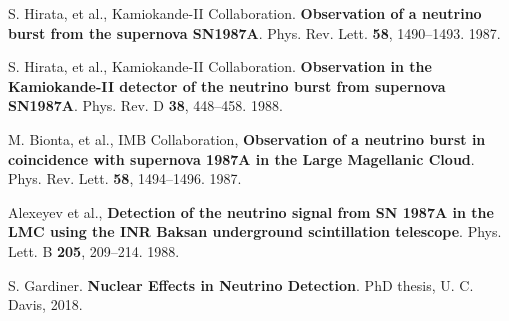  S. Hirata, et al., Kamiokande-II Collaboration. \textbf{Observation of a neutrino burst from the supernova SN1987A}. Phys. Rev. Lett. \textbf{58}, 1490–1493. 1987.

 S. Hirata, et al., Kamiokande-II Collaboration. \textbf{Observation in the Kamiokande-II detector of the neutrino burst from supernova SN1987A}. Phys. Rev. D \textbf{38}, 448–458. 1988.

 M. Bionta, et al., IMB Collaboration, \textbf{Observation of a neutrino burst in coincidence with supernova 1987A in the Large Magellanic Cloud}. Phys. Rev. Lett. \textbf{58}, 1494–1496. 1987. 

 Alexeyev et al., \textbf{Detection of the neutrino signal from SN 1987A in the LMC using the INR Baksan underground scintillation telescope}. Phys. Lett. B \textbf{205}, 209–214. 1988.

 S. Gardiner. \textbf{Nuclear Effects in Neutrino Detection}. PhD thesis,  U. C. Davis, 2018.





